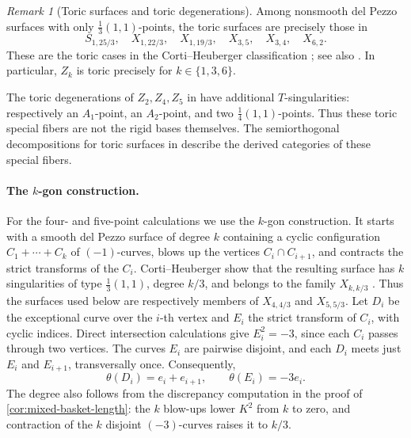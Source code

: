 \documentclass[11pt]{article}
\theoremstyle{plain}
\theoremstyle{definition}
\theoremstyle{remark}
\newtheorem{remark}[remark]{Remark}
\begin{document}
\begin{remark}[Toric surfaces and toric degenerations]
\label{rem:toric-bases-versus-degenerations}
Among nonsmooth del Pezzo surfaces with only \(\frac13(1,1)\)-points,
the toric surfaces are precisely those in
\[
S_{1,25/3},\quad X_{1,22/3},\quad X_{1,19/3},\quad
X_{3,5},\quad X_{3,4},\quad X_{6,2}.
\]
These are the toric cases in the Corti--Heuberger classification
\cite[Tables~1, 2, and~4]{Corti2016}; see also
\cite[Table~1]{OnetoPetracci2018}. In particular, \(Z_k\) is toric
precisely for \(k\in\{1,3,6\}\).

The toric degenerations of \(Z_2,Z_4,Z_5\) in
\cite[Table~4, polygons~23, 11, and~7]{Corti2016} have additional
\(T\)-singularities: respectively an \(A_1\)-point, an \(A_2\)-point,
and two \(\frac14(1,1)\)-points. Thus these toric special fibers
are not the rigid bases themselves. The semiorthogonal decompositions for
toric surfaces in \cite[Section~5]{KKS2020} describe the derived categories
of these special fibers.
\end{remark}

\paragraph{The \(k\)-gon construction.}
For the four- and five-point calculations we use the \(k\)-gon construction.
It starts with a smooth del Pezzo surface of degree \(k\) containing a cyclic
configuration \(C_1+\cdots+C_k\) of \((-1)\)-curves, blows up the vertices
\(C_i\cap C_{i+1}\), and contracts the strict transforms of the \(C_i\).
Corti--Heuberger show that the resulting surface has \(k\) singularities of
type \(\frac13(1,1)\), degree \(k/3\), and belongs to the family
\(X_{k,k/3}\) \cite[Section~3.5, ``\(k\)-gons'']{Corti2016}. Thus the
surfaces used below are respectively members of \(X_{4,4/3}\) and
\(X_{5,5/3}\). Let \(D_i\) be the exceptional curve over the
\(i\)-th vertex and \(E_i\) the strict transform of \(C_i\), with cyclic
indices. Direct intersection calculations give
\(E_i^2=-3\), since each \(C_i\) passes through two vertices.
The curves \(E_i\) are pairwise disjoint, and each \(D_i\) meets just
\(E_i\) and \(E_{i+1}\), transversally once. Consequently,
\[
\theta(D_i)=e_i+e_{i+1},
\qquad
\theta(E_i)=-3e_i.
\]
The degree also follows from the discrepancy computation in
the proof of \cref{cor:mixed-basket-length}: the \(k\) blow-ups lower
\(K^2\) from \(k\) to zero, and contraction of the \(k\) disjoint
\((-3)\)-curves raises it to \(k/3\).
\end{document}
